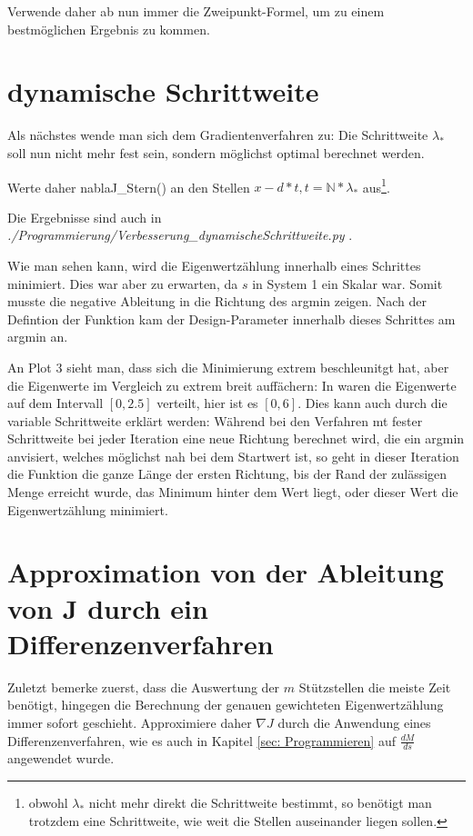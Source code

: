 \documentclass[a4paper,12pt]{report}
\newcommand{\N}{\mathbb N}
\newcommand{\1}{\mathds{1}}
\theoremstyle{plain} %
\theoremstyle{definition} %
\theoremstyle{remark}
\begin{document}
            Verwende daher ab nun immer die Zweipunkt-Formel, um zu einem bestmöglichen Ergebnis zu kommen.

      \section{dynamische Schrittweite}
            Als nächstes wende man sich dem Gradientenverfahren zu:
            Die Schrittweite $\lambda_*$ soll nun nicht mehr fest sein, sondern möglichst optimal berechnet werden.

            Werte daher nablaJ\_Stern() an den Stellen $x-d*t, t=\N*\lambda_*$ aus\footnote{obwohl $\lambda_*$ nicht mehr direkt die Schrittweite bestimmt, so benötigt man trotzdem eine Schrittweite, wie weit die Stellen auseinander liegen sollen.}.

            Die Ergebnisse sind auch in \textit{./Programmierung/Verbesserung\_dynamischeSchrittweite.py} .

            Wie man sehen kann, wird die Eigenwertzählung innerhalb eines Schrittes minimiert. Dies war aber zu erwarten, da $s$ in System 1 ein Skalar war. Somit musste die negative Ableitung in die Richtung des argmin zeigen.
            Nach der Defintion der Funktion kam der Design-Parameter innerhalb dieses Schrittes am argmin an.

            An Plot 3 sieht man, dass sich die Minimierung extrem beschleunitgt hat, aber die Eigenwerte im Vergleich zu extrem breit auffächern:
            In waren die Eigenwerte auf dem Intervall $[0,2.5]$ verteilt, hier ist es $[0,6]$. Dies kann auch durch die variable Schrittweite erklärt werden:
            Während bei den Verfahren mt fester Schrittweite bei jeder Iteration eine neue Richtung berechnet wird, die ein argmin anvisiert, welches möglichst nah bei dem Startwert ist, so geht in dieser Iteration die Funktion die ganze Länge der ersten Richtung, bis der Rand der zulässigen Menge erreicht wurde, das Minimum hinter dem Wert liegt, oder dieser Wert die Eigenwertzählung minimiert.

      \section{Approximation von der Ableitung von J durch ein Differenzenverfahren}

            Zuletzt bemerke zuerst, dass die Auswertung der $m$ Stützstellen die meiste Zeit benötigt, hingegen die Berechnung der genauen gewichteten Eigenwertzählung immer sofort geschieht.
            Approximiere daher $\nabla J$ durch die Anwendung eines Differenzenverfahren, wie es auch in Kapitel \ref{sec: Programmieren} auf $\frac {dM}{ds}$ angewendet wurde.
\end{document}
